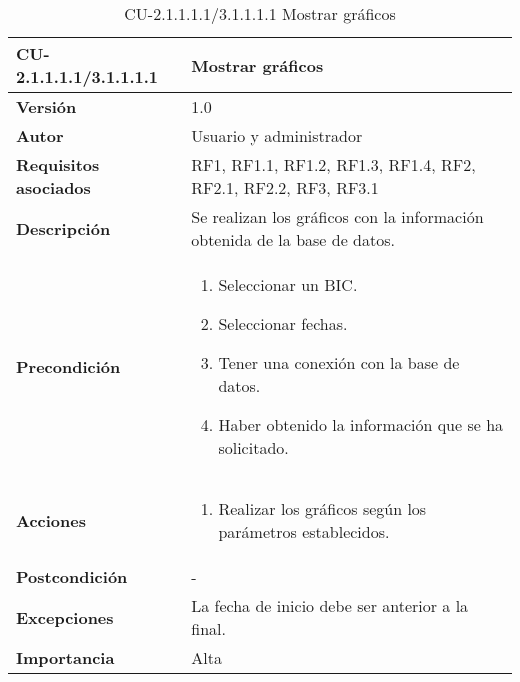 \begin{table}[h!]
	\centering
	\begin{tabularx}{\linewidth}{ p{} p{} }
		\toprule
		\textbf{CU-2.1.1.1.1/3.1.1.1.1}    & \textbf{Mostrar gráficos}\\
		\toprule
		\textbf{Versión}              & 1.0    \\
		\textbf{Autor}                & Usuario y administrador \\
		\textbf{Requisitos asociados} & RF1, RF1.1, RF1.2, RF1.3, RF1.4, RF2, RF2.1, RF2.2, RF3, RF3.1\\
		\textbf{Descripción}          & Se realizan los gráficos con la información obtenida de la base de datos.  \\
        \textbf{Precondición}         & 
        \begin{enumerate}
			\def\labelenumi{\arabic{enumi}.}
			\tightlist
                \item Seleccionar un BIC.
                \item Seleccionar fechas. 
			\item Tener una conexión con la base de datos.
                \item Haber obtenido la información que se ha solicitado.
            
		\end{enumerate}\\
		
		\textbf{Acciones}             &
		\begin{enumerate}
			\def\labelenumi{\arabic{enumi}.}
			\tightlist
			\item Realizar los gráficos según los parámetros establecidos.
            
		\end{enumerate}\\
		\textbf{Postcondición}        &  - \\
		\textbf{Excepciones}          &  La fecha de inicio debe ser anterior a la final.\\
		\textbf{Importancia}          & Alta \\
		\bottomrule
	\end{tabularx}
	\caption{CU-2.1.1.1.1/3.1.1.1.1 Mostrar gráficos}
\end{table}

